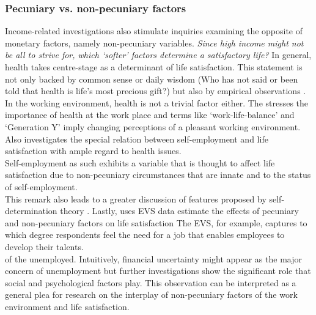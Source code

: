 \documentclass[preprint,12pt,authoryear]{elsarticle}
\begin{document}
\subsubsection{Pecuniary vs. non-pecuniary factors}
Income-related investigations also stimulate inquiries examining the opposite of monetary factors, namely non-pecuniary
variables. \textit{Since high income might not be all to strive for, which `softer' factors determine a satisfactory life?}
In general, health takes centre-stage as a determinant of life satisfaction. This statement is not only backed by common 
sense or daily wisdom (Who has not said or been told that health is life's most precious gift?) but also by empirical observations \citep{pedersen_happiness_2011}. \\
In the working environment, health is not a trivial factor either. The \citet{who_global_1994} stresses the importance of health at the work place and terms like `work-life-balance' and `Generation Y' imply changing perceptions of a pleasant working environment. Also \citet{andersson_happiness_2008}
investigates the special relation between self-employment and life satisfaction with ample regard to health issues. \\
Self-employment as such exhibits a variable that is thought to affect life satisfaction \citep{andersson_happiness_2008,schneck_why_2014,van_der_zwan_self-employment_2018}
due to non-pecuniary circumstances that are innate and to the status of self-employment. \\
This remark also leads to a greater discussion of features proposed by self-determination theory \citep{deci_intrinsic_1985,deci_self-determination_1989,ryan_self-determination_2000}.
Lastly, \citet{luo_essays_2018} uses EVS data estimate the effects of pecuniary and non-pecuniary factors on life satisfaction
The EVS, for example, captures to which degree respondents feel the need for a job that enables employees to develop their talents. \\
of the unemployed. Intuitively, financial uncertainty might appear as the major concern of unemployment but further investigations
show the significant role that social and psychological factors play. This observation can be interpreted as a general plea for research on
the interplay of non-pecuniary factors of the work environment and life satisfaction. 
\end{document}
